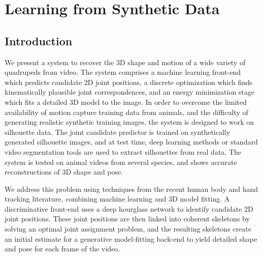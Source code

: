 

\chapter{Learning from Synthetic Data}

\def\figref#1{Fig.~\ref{fig:#1}}

\ifpdf
    \graphicspath{{Chapter4/Figs/Raster/}{Chapter4/Figs/PDF/}{Chapter4/Figs/}}
\else
    \graphicspath{{Chapter4/Figs/Vector/}{Chapter4/Figs/}}
\fi




\section{Introduction}
We present a system to recover the 3D shape and motion of a wide variety of quadrupeds from video.  The system comprises a machine learning front-end which predicts candidate 2D joint positions, a discrete optimization which finds kinematically plausible joint correspondences, 
and an energy minimization stage which fits a detailed 3D model to the image. In order to overcome the limited availability of motion capture training data from animals, and the difficulty of generating realistic synthetic training images, the system is designed to work on silhouette data.  The joint candidate predictor is trained on synthetically generated silhouette images, and at test time, deep learning methods or standard video segmentation tools are used to extract silhouettes from real data. The system is tested on animal videos from several species, and shows accurate reconstructions of 3D shape and pose.

We address this problem using techniques from the recent human body and hand tracking literature, combining machine learning and 3D model fitting.  A discriminative front-end uses a deep hourglass network to identify candidate 2D joint positions. These joint positions are then linked into coherent skeletons by solving an optimal joint assignment problem, and the resulting skeletons create an initial estimate for a generative model-fitting back-end to yield detailed shape and pose for each frame of the video.  

